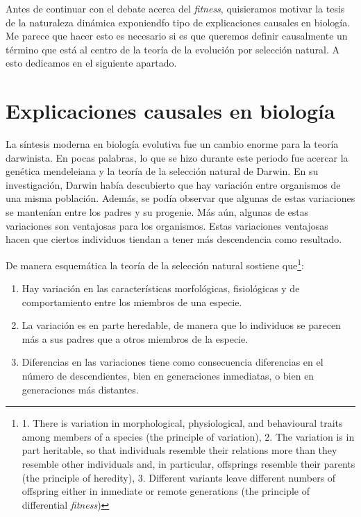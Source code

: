 Antes de continuar con el debate acerca del \emph{fitness}, quisieramos motivar la tesis de la naturaleza dinámica exponiendfo tipo de explicaciones causales en biología. Me parece que hacer esto es necesario si es que queremos definir causalmente un término que está al centro de la teoría de la evolución por selección natural. A esto dedicamos en el siguiente apartado.

\section{Explicaciones causales en biología}

\noindent La síntesis moderna en biología evolutiva fue un cambio enorme para la teoría darwinista. En pocas palabras, lo que se hizo durante este periodo fue acercar la genética mendeleiana y la teoría de la selección natural de Darwin. En su investigación, Darwin había descubierto que hay variación entre organismos de una misma población. Además, se podía observar que algunas de estas variaciones se mantenían entre los padres y su progenie. Más aún, algunas de estas variaciones son ventajosas para los organismos. Estas variaciones ventajosas hacen que ciertos individuos tiendan a tener más descendencia como resultado.

De manera esquemática la teoría de la selección natural sostiene que\footnote{1. There is variation in morphological, physiological, and behavioural traits among members of a species (the principle of variation), 2. The variation is in part heritable, so that individuals resemble their relations more than they resemble other individuals and, in particular, offsprings resemble their parents (the principle of heredity), 3. Different variants leave different numbers of offspring either in inmediate or remote generations (the principle of differential \emph{fitness})}:

\begin{enumerate}
  \item Hay variación en las características morfológicas, fisiológicas y de comportamiento entre los miembros de una especie.
  \item La variación es en parte heredable, de manera que lo individuos se parecen más a sus padres que a otros miembros de la especie.
  \item Diferencias en las variaciones tiene como consecuencia diferencias en el número de descendientes, bien en generaciones inmediatas, o bien en generaciones más distantes\cite{Godfrey-Smith2013}.
\end{enumerate}

